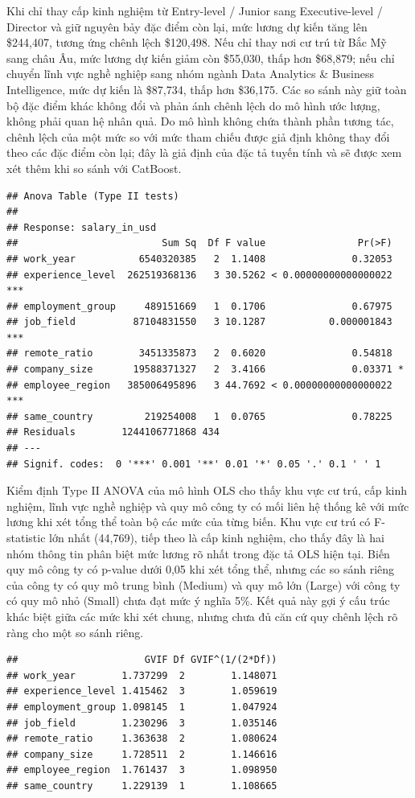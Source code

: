 Khi chỉ thay cấp kinh nghiệm từ Entry-level / Junior sang
Executive-level / Director và giữ nguyên bảy đặc điểm còn lại, mức lương
dự kiến tăng lên \$244,407, tương ứng chênh lệch \$120,498. Nếu chỉ thay
nơi cư trú từ Bắc Mỹ sang châu Âu, mức lương dự kiến giảm còn \$55,030,
thấp hơn \$68,879; nếu chỉ chuyển lĩnh vực nghề nghiệp sang nhóm ngành
Data Analytics \& Business Intelligence, mức dự kiến là \$87,734, thấp
hơn \$36,175. Các so sánh này giữ toàn bộ đặc điểm khác không đổi và
phản ánh chênh lệch do mô hình ước lượng, không phải quan hệ nhân quả.
Do mô hình không chứa thành phần tương tác, chênh lệch của một mức so
với mức tham chiếu được giả định không thay đổi theo các đặc điểm còn
lại; đây là giả định của đặc tả tuyến tính và sẽ được xem xét thêm khi
so sánh với CatBoost.

\begin{verbatim}
## Anova Table (Type II tests)
## 
## Response: salary_in_usd
##                         Sum Sq  Df F value                Pr(>F)    
## work_year           6540320385   2  1.1408               0.32053    
## experience_level  262519368136   3 30.5262 < 0.00000000000000022 ***
## employment_group     489151669   1  0.1706               0.67975    
## job_field          87104831550   3 10.1287           0.000001843 ***
## remote_ratio        3451335873   2  0.6020               0.54818    
## company_size       19588371327   2  3.4166               0.03371 *  
## employee_region   385006495896   3 44.7692 < 0.00000000000000022 ***
## same_country         219254008   1  0.0765               0.78225    
## Residuals        1244106771868 434                                  
## ---
## Signif. codes:  0 '***' 0.001 '**' 0.01 '*' 0.05 '.' 0.1 ' ' 1
\end{verbatim}

Kiểm định Type II ANOVA của mô hình OLS cho thấy khu vực cư trú, cấp
kinh nghiệm, lĩnh vực nghề nghiệp và quy mô công ty có mối liên hệ thống
kê với mức lương khi xét tổng thể toàn bộ các mức của từng biến. Khu vực
cư trú có F-statistic lớn nhất (44,769), tiếp theo là cấp kinh nghiệm,
cho thấy đây là hai nhóm thông tin phân biệt mức lương rõ nhất trong đặc
tả OLS hiện tại. Biến quy mô công ty có p-value dưới 0,05 khi xét tổng
thể, nhưng các so sánh riêng của công ty có quy mô trung bình (Medium)
và quy mô lớn (Large) với công ty có quy mô nhỏ (Small) chưa đạt mức ý
nghĩa 5\%. Kết quả này gợi ý cấu trúc khác biệt giữa các mức khi xét
chung, nhưng chưa đủ căn cứ quy chênh lệch rõ ràng cho một so sánh
riêng.

\begin{verbatim}
##                      GVIF Df GVIF^(1/(2*Df))
## work_year        1.737299  2        1.148071
## experience_level 1.415462  3        1.059619
## employment_group 1.098145  1        1.047924
## job_field        1.230296  3        1.035146
## remote_ratio     1.363638  2        1.080624
## company_size     1.728511  2        1.146616
## employee_region  1.761437  3        1.098950
## same_country     1.229139  1        1.108665
\end{verbatim}

